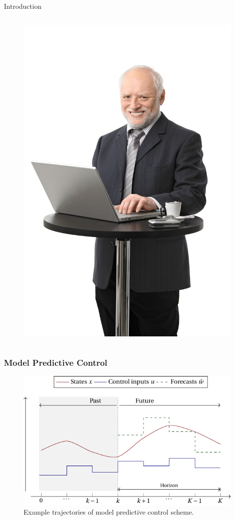 \begin{frame}{Introduction}
{\begin{columns}
\begin{column}{0.5\textwidth}
\begin{figure}
                    \includegraphics[scale=0.1]{figures/computer.jpeg}
                \end{figure}
            \end{column}
        \end{columns}
    }
\end{frame}

\begin{frame}
    \frametitle{Model Predictive Control}
    
    \begin{figure}
        \centering
        \includegraphics[scale=0.8]{figures/mpc1.pdf}
        \caption{Example trajectories of model predictive control scheme.}
    \end{figure}

\end{frame}